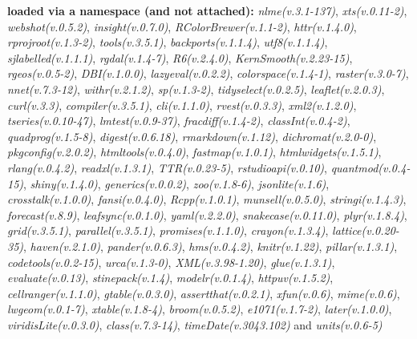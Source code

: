 \documentclass[]{article}
\begin{document}
\textbf{loaded via a namespace (and not attached):}
\emph{nlme(v.3.1-137)}, \emph{xts(v.0.11-2)}, \emph{webshot(v.0.5.2)},
\emph{insight(v.0.7.0)}, \emph{RColorBrewer(v.1.1-2)},
\emph{httr(v.1.4.0)}, \emph{rprojroot(v.1.3-2)}, \emph{tools(v.3.5.1)},
\emph{backports(v.1.1.4)}, \emph{utf8(v.1.1.4)},
\emph{sjlabelled(v.1.1.1)}, \emph{rgdal(v.1.4-7)}, \emph{R6(v.2.4.0)},
\emph{KernSmooth(v.2.23-15)}, \emph{rgeos(v.0.5-2)},
\emph{DBI(v.1.0.0)}, \emph{lazyeval(v.0.2.2)},
\emph{colorspace(v.1.4-1)}, \emph{raster(v.3.0-7)},
\emph{nnet(v.7.3-12)}, \emph{withr(v.2.1.2)}, \emph{sp(v.1.3-2)},
\emph{tidyselect(v.0.2.5)}, \emph{leaflet(v.2.0.3)}, \emph{curl(v.3.3)},
\emph{compiler(v.3.5.1)}, \emph{cli(v.1.1.0)}, \emph{rvest(v.0.3.3)},
\emph{xml2(v.1.2.0)}, \emph{tseries(v.0.10-47)},
\emph{lmtest(v.0.9-37)}, \emph{fracdiff(v.1.4-2)},
\emph{classInt(v.0.4-2)}, \emph{quadprog(v.1.5-8)},
\emph{digest(v.0.6.18)}, \emph{rmarkdown(v.1.12)},
\emph{dichromat(v.2.0-0)}, \emph{pkgconfig(v.2.0.2)},
\emph{htmltools(v.0.4.0)}, \emph{fastmap(v.1.0.1)},
\emph{htmlwidgets(v.1.5.1)}, \emph{rlang(v.0.4.2)},
\emph{readxl(v.1.3.1)}, \emph{TTR(v.0.23-5)}, \emph{rstudioapi(v.0.10)},
\emph{quantmod(v.0.4-15)}, \emph{shiny(v.1.4.0)},
\emph{generics(v.0.0.2)}, \emph{zoo(v.1.8-6)}, \emph{jsonlite(v.1.6)},
\emph{crosstalk(v.1.0.0)}, \emph{fansi(v.0.4.0)}, \emph{Rcpp(v.1.0.1)},
\emph{munsell(v.0.5.0)}, \emph{stringi(v.1.4.3)},
\emph{forecast(v.8.9)}, \emph{leafsync(v.0.1.0)}, \emph{yaml(v.2.2.0)},
\emph{snakecase(v.0.11.0)}, \emph{plyr(v.1.8.4)}, \emph{grid(v.3.5.1)},
\emph{parallel(v.3.5.1)}, \emph{promises(v.1.1.0)},
\emph{crayon(v.1.3.4)}, \emph{lattice(v.0.20-35)},
\emph{haven(v.2.1.0)}, \emph{pander(v.0.6.3)}, \emph{hms(v.0.4.2)},
\emph{knitr(v.1.22)}, \emph{pillar(v.1.3.1)},
\emph{codetools(v.0.2-15)}, \emph{urca(v.1.3-0)},
\emph{XML(v.3.98-1.20)}, \emph{glue(v.1.3.1)}, \emph{evaluate(v.0.13)},
\emph{stinepack(v.1.4)}, \emph{modelr(v.0.1.4)}, \emph{httpuv(v.1.5.2)},
\emph{cellranger(v.1.1.0)}, \emph{gtable(v.0.3.0)},
\emph{assertthat(v.0.2.1)}, \emph{xfun(v.0.6)}, \emph{mime(v.0.6)},
\emph{lwgeom(v.0.1-7)}, \emph{xtable(v.1.8-4)}, \emph{broom(v.0.5.2)},
\emph{e1071(v.1.7-2)}, \emph{later(v.1.0.0)},
\emph{viridisLite(v.0.3.0)}, \emph{class(v.7.3-14)},
\emph{timeDate(v.3043.102)} and \emph{units(v.0.6-5)}
\end{document}
